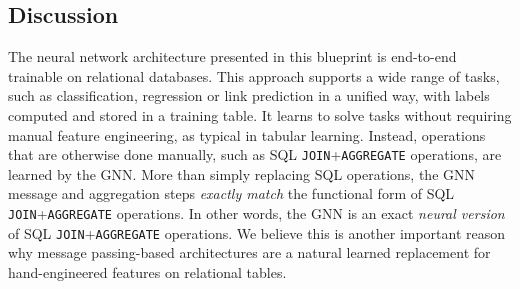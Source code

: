 \subsection{Discussion}

The neural network architecture presented in this blueprint is end-to-end trainable on relational databases. This approach supports a wide range of tasks, such as classification, regression or link prediction in a unified way, with labels computed and stored in a training table.  
It learns to solve tasks without requiring manual feature engineering, as typical in tabular learning. Instead, operations that are otherwise done manually, such as SQL \texttt{JOIN}+\texttt{AGGREGATE} 
 operations, are learned by the GNN. More than simply replacing SQL operations, the GNN message and aggregation steps \emph{exactly match} the functional form of SQL \texttt{JOIN}+\texttt{AGGREGATE} operations. In other words, the GNN is an exact \emph{neural version} of SQL \texttt{JOIN}+\texttt{AGGREGATE} operations. We believe this is another important reason why message passing-based architectures are a natural learned replacement for hand-engineered features on relational tables.

